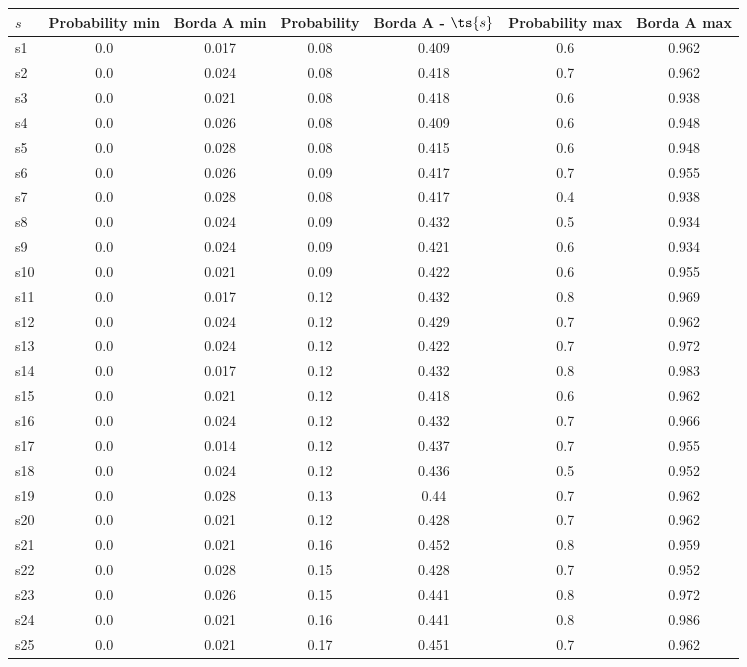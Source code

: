 \documentclass{article}
\begin{document}
\noindent\begin{tabular}{|l|c|c|c|c|c|c|}
\hline
$s$& Probability min & Borda A min & Probability & Borda A - $\ts{s}$ & Probability max & Borda A max\\
\hline
s1 &0.0 & 0.017 & 0.08 & 0.409 & 0.6 & 0.962\\
\hline
s2 &0.0 & 0.024 & 0.08 & 0.418 & 0.7 & 0.962\\
\hline
s3 &0.0 & 0.021 & 0.08 & 0.418 & 0.6 & 0.938\\
\hline
s4 &0.0 & 0.026 & 0.08 & 0.409 & 0.6 & 0.948\\
\hline
s5 &0.0 & 0.028 & 0.08 & 0.415 & 0.6 & 0.948\\
\hline
s6 &0.0 & 0.026 & 0.09 & 0.417 & 0.7 & 0.955\\
\hline
s7 &0.0 & 0.028 & 0.08 & 0.417 & 0.4 & 0.938\\
\hline
s8 &0.0 & 0.024 & 0.09 & 0.432 & 0.5 & 0.934\\
\hline
s9 &0.0 & 0.024 & 0.09 & 0.421 & 0.6 & 0.934\\
\hline
s10 &0.0 & 0.021 & 0.09 & 0.422 & 0.6 & 0.955\\
\hline
s11 &0.0 & 0.017 & 0.12 & 0.432 & 0.8 & 0.969\\
\hline
s12 &0.0 & 0.024 & 0.12 & 0.429 & 0.7 & 0.962\\
\hline
s13 &0.0 & 0.024 & 0.12 & 0.422 & 0.7 & 0.972\\
\hline
s14 &0.0 & 0.017 & 0.12 & 0.432 & 0.8 & 0.983\\
\hline
s15 &0.0 & 0.021 & 0.12 & 0.418 & 0.6 & 0.962\\
\hline
s16 &0.0 & 0.024 & 0.12 & 0.432 & 0.7 & 0.966\\
\hline
s17 &0.0 & 0.014 & 0.12 & 0.437 & 0.7 & 0.955\\
\hline
s18 &0.0 & 0.024 & 0.12 & 0.436 & 0.5 & 0.952\\
\hline
s19 &0.0 & 0.028 & 0.13 & 0.44 & 0.7 & 0.962\\
\hline
s20 &0.0 & 0.021 & 0.12 & 0.428 & 0.7 & 0.962\\
\hline
s21 &0.0 & 0.021 & 0.16 & 0.452 & 0.8 & 0.959\\
\hline
s22 &0.0 & 0.028 & 0.15 & 0.428 & 0.7 & 0.952\\
\hline
s23 &0.0 & 0.026 & 0.15 & 0.441 & 0.8 & 0.972\\
\hline
s24 &0.0 & 0.021 & 0.16 & 0.441 & 0.8 & 0.986\\
\hline
s25 &0.0 & 0.021 & 0.17 & 0.451 & 0.7 & 0.962\\
\hline

\end{tabular}
\end{document}
